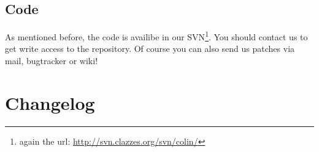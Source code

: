 \documentclass[a4paper,11pt]{report}
\begin{document}
\section{Code}
As mentioned before, the code is availibe in our SVN\footnote{again the url: \url{http://svn.clazzes.org/svn/colin/}}. You should contact us to get write access to the repository. Of course you can also send us patches via mail, bugtracker or wiki!

\chapter{Changelog}




%
\end{document}
